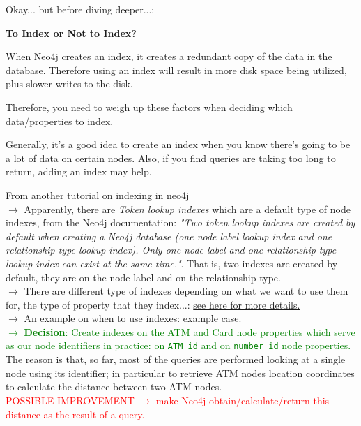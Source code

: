 \documentclass{article}
\begin{document}
Okay... but before diving deeper...:

\textbf{To Index or Not to Index?}
\begin{tcolorbox}
When Neo4j creates an index, it creates a redundant copy of the data in the database. Therefore using an index will result in more disk space being utilized, plus slower writes to the disk.

Therefore, you need to weigh up these factors when deciding which data/properties to index.

Generally, it's a good idea to create an index when you know there's going to be a lot of data on certain nodes. Also, if you find queries are taking too long to return, adding an index may help.
\end{tcolorbox}

From \href{https://www.quackit.com/neo4j/tutorial/neo4j_create_an_index_using_cypher.cfm#google_vignette}{another tutorial on indexing in neo4j}\\

$\rightarrow$ Apparently, there are \emph{Token lookup indexes} which are a default type of node indexes, from the Neo4j documentation: \textit{"Two token lookup indexes are created by default when creating a Neo4j database (one node label lookup index and one relationship type lookup index). Only one node label and one relationship type lookup index can exist at the same time."}. 
That is, two indexes are created by default, they are on the node label and on the relationship type.\\

$\rightarrow$ There are different type of indexes depending on what we want to use them for, the type of property that they index...: \href{https://neo4j.com/docs/cypher-manual/current/indexes/search-performance-indexes/managing-indexes/#create-indexes}{see here for more details.}\\

$\rightarrow$ An example on when to use indexes: \href{https://stackoverflow.com/questions/51313374/what-is-indexing-means-neo4j-and-how-it-effects-performance}{example case}.\\



\textcolor{green}{$\rightarrow$ \textbf{Decision}: Create indexes on the ATM and Card node properties which serve as our node identifiers in practice: on \texttt{ATM\_id} and on \texttt{number\_id} node properties.} The reason is that, so far, most of the queries are performed looking at a single node using its identifier; in particular to retrieve ATM nodes location coordinates to calculate the distance between two ATM nodes.\\
\textcolor{red}{POSSIBLE IMPROVEMENT $\rightarrow$ make Neo4j obtain/calculate/return this distance as the result of a query.}
\end{document}
